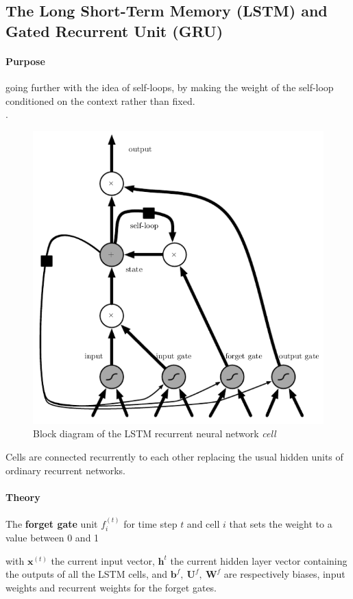 \subsection{The Long Short-Term Memory (LSTM) and Gated Recurrent Unit (GRU)}
\paragraph{Purpose}
going further with the idea of self-loops, by making the weight of the self-loop
conditioned on the context rather than fixed.\\
.

\begin{figure}[H]
    \begin{center}
        \includegraphics[width=.5\textwidth]{chapters/4_deep_learning/3_types_of_neural_networks/images/04_lstm_rnn_cell.png}
    \end{center}
    \caption{Block diagram of the LSTM recurrent neural network \emph{cell}}
    \label{fig:label}
\end{figure}

Cells are connected recurrently to each other replacing the usual hidden units of
ordinary recurrent networks.

\paragraph{Theory}
The \textbf{forget gate} unit $f_{i}^{(t)}$ for time step $t$ and cell $i$ that sets
the weight to a value between 0 and 1
\begin{center}
\end{center}
with $\bm{x}^{(t)}$ the current input vector, $\bm{h}^{t}$ the current hidden layer vector
containing the outputs of all the LSTM cells, and $\bm{b}^{f},~\bm{U}^{f},~\bm{W}^{f}$ are
respectively biases, input weights and recurrent weights for the forget gates.

